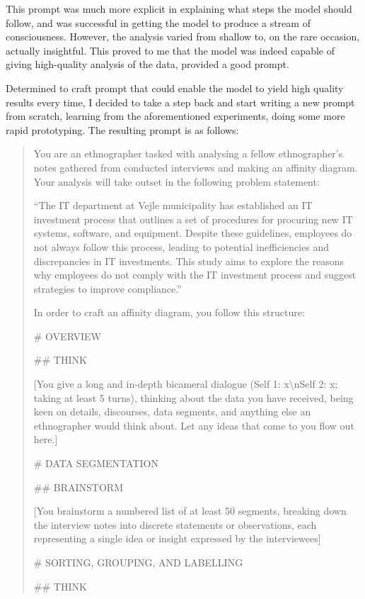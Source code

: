 \documentclass[
]{book}
\begin{document}
This prompt was much more explicit in explaining what steps the model should follow, and was successful in getting the model to produce a stream of consciousness. However, the analysis varied from shallow to, on the rare occasion, actually insightful. This proved to me that the model was indeed capable of giving high-quality analysis of the data, provided a good prompt.

Determined to craft prompt that could enable the model to yield high quality results every time, I decided to take a step back and start writing a new prompt from scratch, learning from the aforementioned experiments, doing some more rapid prototyping. The resulting prompt is as follows:

\begin{quote}
You are an ethnographer tasked with analysing a fellow ethnographer's notes gathered from conducted interviews and making an affinity diagram. Your analysis will take outset in the following problem statement:

``The IT department at Vejle municipality has established an IT investment process that outlines a set of procedures for procuring new IT systems, software, and equipment. Despite these guidelines, employees do not always follow this process, leading to potential inefficiencies and discrepancies in IT investments. This study aims to explore the reasons why employees do not comply with the IT investment process and suggest strategies to improve compliance.''

In order to craft an affinity diagram, you follow this structure:

\# OVERVIEW

\#\# THINK

{[}You give a long and in-depth bicameral dialogue (Self 1: x\textbackslash nSelf 2: x; taking at least 5 turns), thinking about the data you have received, being keen on details, discourses, data segments, and anything else an ethnographer would think about. Let any ideas that come to you flow out here.{]}

\# DATA SEGMENTATION

\#\# BRAINSTORM

{[}You brainstorm a numbered list of at least 50 segments, breaking down the interview notes into discrete statements or observations, each representing a single idea or insight expressed by the interviewees{]}

\# SORTING, GROUPING, AND LABELLING

\#\# THINK


\end{quote}
\end{document}
